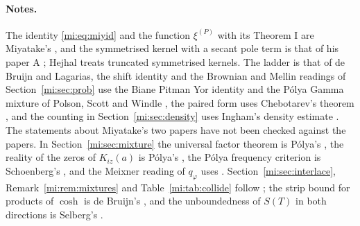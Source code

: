\paragraph{Notes.} The identity \eqref{mi:eq:miyid} and the function $\xi^{(P)}$ with its Theorem I are Miyatake's \cite{Miyatake51b}, and the symmetrised kernel with a secant pole term is that of his paper A \cite{Miyatake51a}; Hejhal \cite{Hejhal90} treats truncated symmetrised kernels. The ladder is that of de Bruijn and Lagarias, the shift identity and the Brownian and Mellin readings of Section~\ref{mi:sec:prob} use the Biane Pitman Yor identity \cite{BPY01} and the P\'olya Gamma mixture of Polson, Scott and Windle \cite{PSW13}, the paired form uses Chebotarev's theorem \cite{Chebotarev28}, and the counting in Section~\ref{mi:sec:density} uses Ingham's density estimate \cite{Ingham40}. The statements about Miyatake's two papers have not been checked against the papers. In Section~\ref{mi:sec:mixture} \cite{P26pg8} the universal factor theorem is P\'olya's \cite{Polya27}, the reality of the zeros of $K_{iz}(a)$ is P\'olya's \cite{Polya}, the P\'olya frequency criterion is Schoenberg's \cite{Schoenberg51}, and the Meixner reading of $q_\varphi$ uses \cite{Grigelionis99,PolsonScott12}. Section~\ref{mi:sec:interlace}, Remark~\ref{mi:rem:mixtures} and Table~\ref{mi:tab:collide} follow \cite{P26pg10}; the strip bound for products of $\cosh$ is de Bruijn's \cite{deBruijn}, and the unboundedness of $S(T)$ in both directions is Selberg's \cite{Selberg46}.

